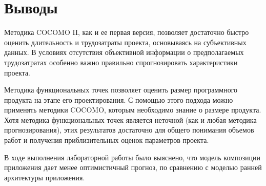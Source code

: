 \chapter{Выводы}

Методика COCOMO II, как и ее первая версия, позволяет достаточно быстро оценить длительность и трудозатраты проекта, основываясь на субъективных данных. В условиях отсутствия объективной информации о предполагаемых трудозатратах особенно важно правильно спрогнозировать характеристики проекта. 

Методика функциональных точек позволяет оценить размер программного продукта на этапе его проектирования. С помощью этого подхода можно применять методики COCOMO, которым необходимо знание о размере продукта. Хотя методика функциональных точек является неточной (как и любая методика прогнозирования), этих результатов достаточно для общего понимания объемов работ и получения приблизительных оценок параметров проекта.

В ходе выполнения лабораторной работы было выяснено, что модель композиции приложения дает менее оптимистичный прогноз, по сравнению с моделью ранней архитектуры приложения.
